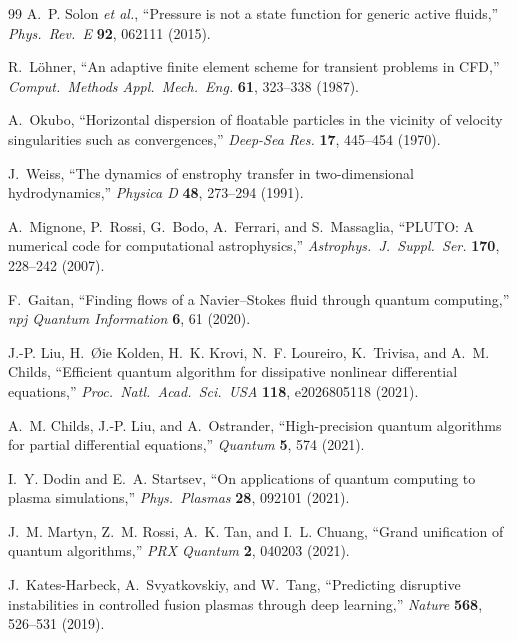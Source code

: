 \documentclass[12pt, a4paper, oneside]{report}
\begin{document}
\begin{thebibliography}{99}
A.~P. Solon \textit{et al.}, ``Pressure is not a state function for generic active fluids,'' \textit{Phys.\ Rev.\ E} \textbf{92}, 062111 (2015).

R.~L\"ohner, ``An adaptive finite element scheme for transient problems in CFD,'' \textit{Comput.\ Methods Appl.\ Mech.\ Eng.} \textbf{61}, 323--338 (1987).

A.~Okubo, ``Horizontal dispersion of floatable particles in the vicinity of velocity singularities such as convergences,'' \textit{Deep-Sea Res.} \textbf{17}, 445--454 (1970).

J.~Weiss, ``The dynamics of enstrophy transfer in two-dimensional hydrodynamics,'' \textit{Physica D} \textbf{48}, 273--294 (1991).

A.~Mignone, P.~Rossi, G.~Bodo, A.~Ferrari, and S.~Massaglia, ``PLUTO: A numerical code for computational astrophysics,'' \textit{Astrophys.\ J.\ Suppl.\ Ser.} \textbf{170}, 228--242 (2007).


F.~Gaitan, ``Finding flows of a Navier--Stokes fluid through quantum computing,'' \textit{npj Quantum Information} \textbf{6}, 61 (2020).

J.-P. Liu, H.~{\O}ie Kolden, H.~K. Krovi, N.~F. Loureiro, K.~Trivisa, and A.~M. Childs, ``Efficient quantum algorithm for dissipative nonlinear differential equations,'' \textit{Proc.\ Natl.\ Acad.\ Sci.\ USA} \textbf{118}, e2026805118 (2021).

A.~M. Childs, J.-P. Liu, and A.~Ostrander, ``High-precision quantum algorithms for partial differential equations,'' \textit{Quantum} \textbf{5}, 574 (2021).

I.~Y. Dodin and E.~A. Startsev, ``On applications of quantum computing to plasma simulations,'' \textit{Phys.\ Plasmas} \textbf{28}, 092101 (2021).

J.~M. Martyn, Z.~M. Rossi, A.~K. Tan, and I.~L. Chuang, ``Grand unification of quantum algorithms,'' \textit{PRX Quantum} \textbf{2}, 040203 (2021).

J.~Kates-Harbeck, A.~Svyatkovskiy, and W.~Tang, ``Predicting disruptive instabilities in controlled fusion plasmas through deep learning,'' \textit{Nature} \textbf{568}, 526--531 (2019).


\end{thebibliography}
\end{document}
